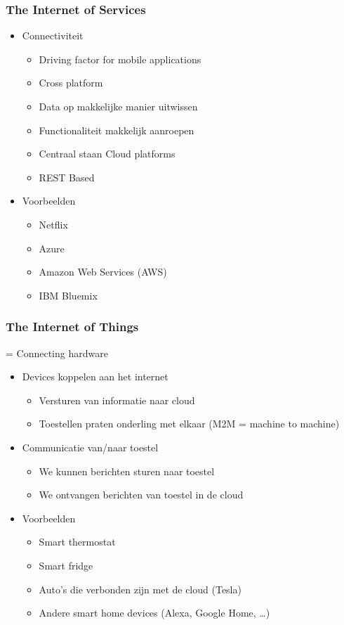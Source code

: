 \documentclass{article}
\begin{document}
\subsubsection{The Internet of Services}
\begin{itemize}
    \item Connectiviteit
    \begin{itemize}
        \item Driving factor for mobile applications
        \item Cross platform
        \item Data op makkelijke manier uitwissen
        \item Functionaliteit makkelijk aanroepen
        \item Centraal staan Cloud platforms
        \item REST Based
    \end{itemize}
    \item Voorbeelden
    \begin{itemize}
        \item Netflix
        \item Azure
        \item Amazon Web Services (AWS)
        \item IBM Bluemix
    \end{itemize}
\end{itemize}


\subsubsection{The Internet of Things}
= Connecting hardware

\begin{itemize}
    \item Devices koppelen aan het internet
    \begin{itemize}
        \item Versturen van informatie naar cloud
        \item Toestellen praten onderling met elkaar (M2M = machine to machine)
    \end{itemize}
    \item Communicatie van/naar toestel
    \begin{itemize}
        \item We kunnen berichten sturen naar toestel
        \item We ontvangen berichten van toestel in de cloud
    \end{itemize}
    \item Voorbeelden
    \begin{itemize}
        \item Smart thermostat
        \item Smart fridge
        \item Auto's die verbonden zijn met de cloud (Tesla)
        \item Andere smart home devices (Alexa, Google Home, \dots)
    \end{itemize}
\end{itemize}
\end{document}
